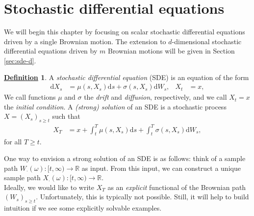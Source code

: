 \documentclass[12pt]{book}
\numberwithin{equation}{chapter}
\theoremstyle{plain}
\numberwithin{theorem}{section}
\theoremstyle{definition}
\newtheorem{definition}[theorem]{\underline{Definition}}
\numberwithin{exercise}{chapter}
\newcommand{\<}{\langle}
\renewcommand{\>}{\rangle}
\renewcommand{\(}{\left(}
\renewcommand{\)}{\right)}
\renewcommand{\[}{\left[}
\renewcommand{\]}{\right]}
\newcommand\Rb{\mathds{R}}
\newcommand\om{\omega}
\newcommand\sig{\sigma}
\newcommand\dd{\mathrm{d}}
\begin{document}
\section{Stochastic differential equations}
\label{sec:sde}

\noindent
We will begin this chapter by focusing on scalar stochastic differential equations driven by a single Brownian motion.  The extension to $d$-dimensional stochastic differential equations driven by $m$ Brownian motions will be given in Section \ref{sec:sde-d}.

\begin{definition}
A \emph{stochastic differential equation} (SDE) is an equation of the form
\begin{align}
\dd X_s
	&=	\mu(s,X_s) \dd s + \sig(s,X_s) \dd W_s , &
X_t
	&=	x , \label{eq:SDE}
\end{align}
We call functions $\mu$ and $\sig$ the \emph{drift} and \emph{diffusion}, respectively, and we call $X_t = x$ the \emph{initial condition}.  A \emph{(strong) solution} of an SDE is a stochastic process $X = (X_s)_{s \geq t}$ such that
\begin{align}
X_T
	&=	x + \int_t^T \mu(s,X_s) \dd s + \int_t^T \sig(s,X_s) \dd W_s , \label{eq:SDE.soln}
\end{align}
for all $T \geq t$.
\end{definition}

\noindent
One way to envision a strong solution of an SDE is as follows: think of a sample path $W_\cdot(\om) : [t,\infty) \to \Rb$ as input.  From this input, we can construct a unique sample path $X_\cdot(\om) : [t,\infty) \to \Rb$.   
\\[0.5em]
Ideally, we would like to write $X_T$ as an \textit{explicit} functional of the Brownian path $(W_s)_{s \geq t}$.  Unfortunately, this is typically not possible.  Still, it will help to build intuition if we see some explicitly solvable examples.
\end{document}
